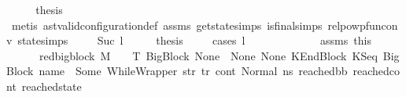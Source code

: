 \begin{isabellebody}
\ \ \isamarkupfalse%
\ \isamarkupfalse%
\ {\isacharquery}{\kern0pt}thesis\ \isamarkupfalse%
\ {\isacharparenleft}{\kern0pt}metis\ ast{\isacharunderscore}{\kern0pt}valid{\isacharunderscore}{\kern0pt}configuration{\isacharunderscore}{\kern0pt}def\ assms{\isacharparenleft}{\kern0pt}{}{\isacharparenright}{\kern0pt}\ get{\isacharunderscore}{\kern0pt}state{\isachardot}{\kern0pt}simps\ is{\isacharunderscore}{\kern0pt}final{\isachardot}{\kern0pt}simps{\isacharparenleft}{\kern0pt}{}{\isacharparenright}{\kern0pt}\ relpowp{\isacharunderscore}{\kern0pt}fun{\isacharunderscore}{\kern0pt}conv\ state{\isachardot}{\kern0pt}simps{\isacharparenleft}{\kern0pt}{}{\isacharparenright}{\kern0pt}{\isacharparenright}{\kern0pt}\isanewline
{}\isamarkupfalse%
\isanewline
\ \ \isamarkupfalse%
\ {}{\isacharcolon}{\kern0pt}\ {\isacharparenleft}{\kern0pt}Suc\ l{}{\isacharparenright}{\kern0pt}\isanewline
\ \ \isamarkupfalse%
\ \isamarkupfalse%
\ {\isacharquery}{\kern0pt}thesis\ \isanewline
\ \ \isamarkupfalse%
\ {\isacharparenleft}{\kern0pt}cases\ l{}{\isacharparenright}{\kern0pt}\isanewline
\ \ \ \ \isamarkupfalse%
\ {}\isanewline
\ \ \ \ \isamarkupfalse%
\ {}\ assms\ this\ \isamarkupfalse%
\ \isanewline
\ \ \ \ \ \ {\isachardoublequoteopen}{\isacharparenleft}{\kern0pt}red{\isacharunderscore}{\kern0pt}bigblock\ M\ {\isasymLambda}\ {\isasymGamma}\ {\isasymOmega}\ T\ {\isacharparenleft}{\kern0pt}BigBlock\ None\ {\isacharbrackleft}{\kern0pt}{\isacharbrackright}{\kern0pt}\ None\ None{\isacharcomma}{\kern0pt}\ KEndBlock\ {\isacharparenleft}{\kern0pt}KSeq\ {\isacharparenleft}{\kern0pt}BigBlock\ name\ {\isacharbrackleft}{\kern0pt}{\isacharbrackright}{\kern0pt}\ {\isacharparenleft}{\kern0pt}Some\ {\isacharparenleft}{\kern0pt}WhileWrapper\ str{\isacharparenright}{\kern0pt}{\isacharparenright}{\kern0pt}\ tr{\isacharparenright}{\kern0pt}\ cont{}{\isacharparenright}{\kern0pt}{\isacharcomma}{\kern0pt}\ Normal\ ns{}{\isacharparenright}{\kern0pt}\ {\isacharparenleft}{\kern0pt}reached{\isacharunderscore}{\kern0pt}bb{\isacharcomma}{\kern0pt}\ reached{\isacharunderscore}{\kern0pt}cont{\isacharcomma}{\kern0pt}\ reached{\isacharunderscore}{\kern0pt}state{\isacharparenright}{\kern0pt}{\isacharparenright}{\kern0pt}{\isachardoublequoteclose}\isanewline
\ \ \ \ \ \ \isamarkupfalse%

\end{isabellebody}

